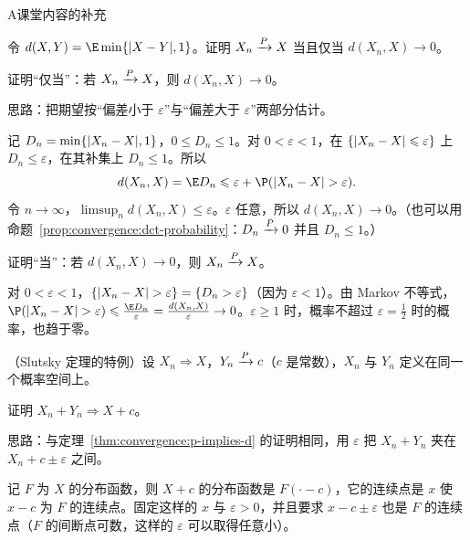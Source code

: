 \begin{exercises}{A}{课堂内容的补充}
\item\label{ex:convergence:A1} 令 $d(X,Y)=\E\min\{\abs{X-Y},1\}$。证明 $X_n\xrightarrow{P} X$ 当且仅当 $d(X_n,X)\to0$。
\begin{questions}
\item 证明“仅当”：若 $X_n\xrightarrow{P} X$，则 $d(X_n,X)\to0$。
\begin{solution}
思路：把期望按“偏差小于 $\varepsilon$”与“偏差大于 $\varepsilon$”两部分估计。

记 $D_n=\min\{\lvert X_n-X\rvert,1\}$，$0\leqslant D_n\leqslant1$。对 $0<\varepsilon<1$，在 $\{\lvert X_n-X\rvert\leqslant\varepsilon\}$ 上 $D_n\leqslant\varepsilon$，在其补集上 $D_n\leqslant1$。所以
\[
d(X_n,X)=\E D_n\leqslant\varepsilon+\P(\abs{X_n-X}>\varepsilon).
\]
令 $n\to\infty$，$\limsup_nd(X_n,X)\leqslant\varepsilon$。$\varepsilon$ 任意，所以 $d(X_n,X)\to0$。（也可以用命题~\ref{prop:convergence:dct-probability}：$D_n\xrightarrow{P}0$ 并且 $D_n\leqslant1$。）
\end{solution}
\item 证明“当”：若 $d(X_n,X)\to0$，则 $X_n\xrightarrow{P} X$。
\begin{solution}
对 $0<\varepsilon<1$，$\{\lvert X_n-X\rvert>\varepsilon\}=\{D_n>\varepsilon\}$（因为 $\varepsilon<1$）。由 Markov 不等式，$\P(\abs{X_n-X}>\varepsilon)\leqslant\frac{\E D_n}\varepsilon=\frac{d(X_n,X)}\varepsilon\to0$。$\varepsilon\geqslant1$ 时，概率不超过 $\varepsilon=\frac12$ 时的概率，也趋于零。
\end{solution}
\end{questions}

\item\label{ex:convergence:A2} （Slutsky 定理的特例）设 $X_n\Rightarrow X$，$Y_n\xrightarrow{P} c$（$c$ 是常数），$X_n$ 与 $Y_n$ 定义在同一个概率空间上。
\begin{questions}
\item 证明 $X_n+Y_n\Rightarrow X+c$。
\begin{solution}
思路：与定理~\ref{thm:convergence:p-implies-d} 的证明相同，用 $\varepsilon$ 把 $X_n+Y_n$ 夹在 $X_n+c\pm\varepsilon$ 之间。

记 $F$ 为 $X$ 的分布函数，则 $X+c$ 的分布函数是 $F(\cdot-c)$，它的连续点是 $x$ 使 $x-c$ 为 $F$ 的连续点。固定这样的 $x$ 与 $\varepsilon>0$，并且要求 $x-c\pm\varepsilon$ 也是 $F$ 的连续点（$F$ 的间断点可数，这样的 $\varepsilon$ 可以取得任意小）。


\end{solution}
\end{questions}
\end{exercises}
